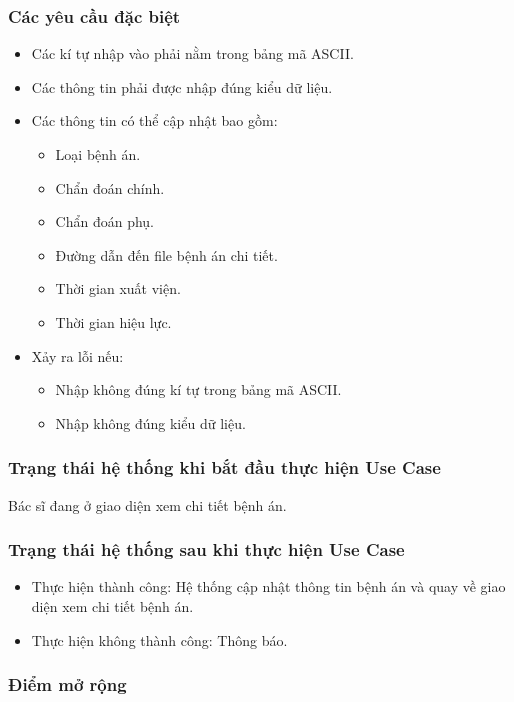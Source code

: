 \subsubsection{Các yêu cầu đặc biệt}
\begin{itemize}
  \item Các kí tự nhập vào phải nằm trong bảng mã ASCII.
  \item Các thông tin phải được nhập đúng kiểu dữ liệu.
  \item Các thông tin có thể cập nhật bao gồm:
    \begin{itemize}
      \item Loại bệnh án.
      \item Chẩn đoán chính.
      \item Chẩn đoán phụ.
      \item Đường dẫn đến file bệnh án chi tiết.
      \item Thời gian xuất viện.
      \item Thời gian hiệu lực.
    \end{itemize}
  \item Xảy ra lỗi nếu:
    \begin{itemize}
      \item Nhập không đúng kí tự trong bảng mã ASCII.
      \item Nhập không đúng kiểu dữ liệu.
    \end{itemize}
\end{itemize}

\subsubsection{Trạng thái hệ thống khi bắt đầu thực hiện Use Case}
Bác sĩ đang ở giao diện xem chi tiết bệnh án.

\subsubsection{Trạng thái hệ thống sau khi thực hiện Use Case}
\begin{itemize}
  \item Thực hiện thành công: Hệ thống cập nhật thông tin bệnh án và quay về giao diện xem chi tiết bệnh án.
  \item Thực hiện không thành công: Thông báo.
\end{itemize}

\subsubsection{Điểm mở rộng}